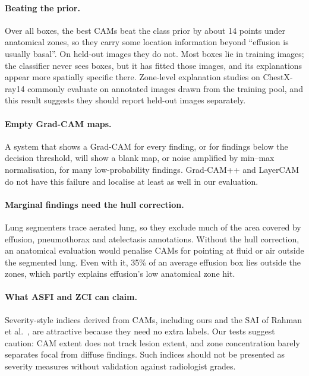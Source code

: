 \documentclass[pdflatex,sn-mathphys-num]{sn-jnl}
\begin{document}
\paragraph{Beating the prior.} Over all boxes, the best CAMs beat the class prior by about 14 points under anatomical zones, so they carry some location information beyond ``effusion is usually basal''. On held-out images they do not. Most boxes lie in training images; the classifier never sees boxes, but it has fitted those images, and its explanations appear more spatially specific there. Zone-level explanation studies on ChestX-ray14 commonly evaluate on annotated images drawn from the training pool, and this result suggests they should report held-out images separately.

\paragraph{Empty Grad-CAM maps.} A system that shows a Grad-CAM for every finding, or for findings below the decision threshold, will show a blank map, or noise amplified by min--max normalisation, for many low-probability findings. Grad-CAM++ and LayerCAM do not have this failure and localise at least as well in our evaluation.

\paragraph{Marginal findings need the hull correction.} Lung segmenters trace aerated lung, so they exclude much of the area covered by effusion, pneumothorax and atelectasis annotations. Without the hull correction, an anatomical evaluation would penalise CAMs for pointing at fluid or air outside the segmented lung. Even with it, 35\% of an average effusion box lies outside the zones, which partly explains effusion's low anatomical zone hit.

\paragraph{What ASFI and ZCI can claim.} Severity-style indices derived from CAMs, including ours and the SAI of Rahman et al.~\cite{rahman2024sai}, are attractive because they need no extra labels. Our tests suggest caution: CAM extent does not track lesion extent, and zone concentration barely separates focal from diffuse findings. Such indices should not be presented as severity measures without validation against radiologist grades.
\end{document}
